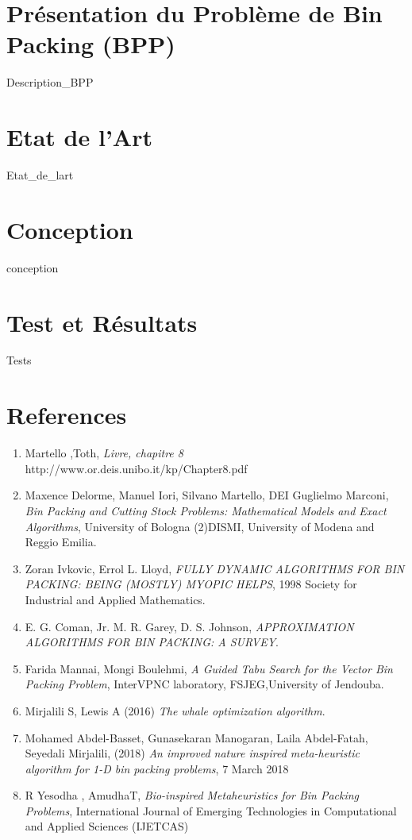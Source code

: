 \documentclass[12pt,a4paper, titlepage]{report}
\begin{document}
    \chapter{Présentation du Problème de Bin Packing (BPP)}
    {Description_BPP}
    \chapter{Etat de l'Art}
    {Etat_de_lart}
    \chapter{Conception}
    {conception}
    \chapter{Test et Résultats}
    {Tests}
    \chapter*{References}
      
    \begin{enumerate}
        \item Martello ,Toth, \emph{Livre, chapitre 8} \\http://www.or.deis.unibo.it/kp/Chapter8.pdf
        \item Maxence Delorme, Manuel Iori, Silvano Martello, DEI Guglielmo Marconi, \emph{Bin Packing and Cutting Stock Problems: Mathematical Models and Exact Algorithms}, University of Bologna (2)DISMI, University of Modena and Reggio Emilia.
        \item Zoran Ivkovic, Errol L. Lloyd, \emph{FULLY DYNAMIC ALGORITHMS FOR BIN PACKING: BEING (MOSTLY) MYOPIC HELPS}, 1998 Society for Industrial and Applied Mathematics.
        \item E. G. Coman, Jr. M. R. Garey, D. S. Johnson, \emph{APPROXIMATION ALGORITHMS FOR BIN PACKING: A SURVEY}.
        \item Farida Mannai, Mongi Boulehmi, \emph{A Guided Tabu Search for the Vector Bin Packing Problem}, InterVPNC laboratory, FSJEG,University of Jendouba.  
        \item Mirjalili S, Lewis A (2016) \emph{The whale optimization algorithm}.
        \item Mohamed Abdel-Basset, Gunasekaran Manogaran, Laila Abdel-Fatah, Seyedali Mirjalili, (2018) \emph{An improved nature inspired meta-heuristic algorithm for 1-D bin packing problems}, 7 March 2018
        \item R Yesodha , AmudhaT, \emph{Bio-inspired Metaheuristics for Bin Packing Problems}, International Journal of Emerging Technologies in Computational and Applied Sciences (IJETCAS)
    \end{enumerate}
    
\end{document}
